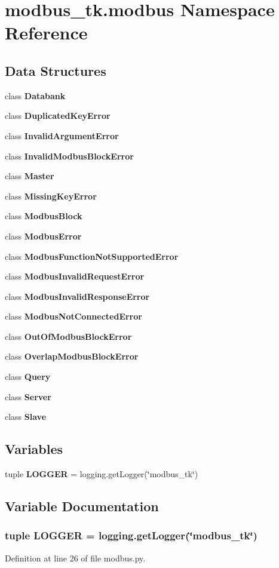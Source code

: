 \section{modbus\+\_\+tk.\+modbus Namespace Reference}
\label{namespacemodbus__tk_1_1modbus}
\subsection*{Data Structures}
\begin{DoxyCompactItemize}
\item 
class {\bf Databank}
\item 
class {\bf Duplicated\+Key\+Error}
\item 
class {\bf Invalid\+Argument\+Error}
\item 
class {\bf Invalid\+Modbus\+Block\+Error}
\item 
class {\bf Master}
\item 
class {\bf Missing\+Key\+Error}
\item 
class {\bf Modbus\+Block}
\item 
class {\bf Modbus\+Error}
\item 
class {\bf Modbus\+Function\+Not\+Supported\+Error}
\item 
class {\bf Modbus\+Invalid\+Request\+Error}
\item 
class {\bf Modbus\+Invalid\+Response\+Error}
\item 
class {\bf Modbus\+Not\+Connected\+Error}
\item 
class {\bf Out\+Of\+Modbus\+Block\+Error}
\item 
class {\bf Overlap\+Modbus\+Block\+Error}
\item 
class {\bf Query}
\item 
class {\bf Server}
\item 
class {\bf Slave}
\end{DoxyCompactItemize}
\subsection*{Variables}
\begin{DoxyCompactItemize}
\item 
tuple {\bf L\+O\+G\+G\+E\+R} = logging.\+get\+Logger(\char`\"{}modbus\+\_\+tk\char`\"{})
\end{DoxyCompactItemize}


\subsection{Variable Documentation}
\subsubsection[{L\+O\+G\+G\+E\+R}]{\setlength{\rightskip}{0pt plus 5cm}tuple L\+O\+G\+G\+E\+R = logging.\+get\+Logger(\char`\"{}modbus\+\_\+tk\char`\"{})}\label{namespacemodbus__tk_1_1modbus_ae9c29667350ae00a0837fc1e77c279e2}


Definition at line 26 of file modbus.\+py.

